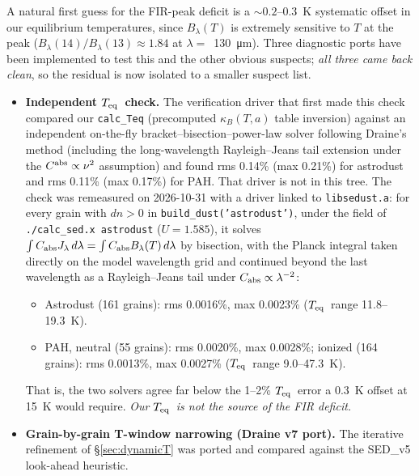 \documentclass{my_memo}
\newcommand{\Teq}{\ensuremath{T_{\rm eq}}}
\begin{document}
A natural first guess for the FIR-peak deficit is a $\sim
0.2$--$0.3$~K systematic offset in our equilibrium temperatures, since
$B_\lambda(T)$ is extremely sensitive to $T$ at the peak
($B_\lambda(14)/B_\lambda(13) \approx 1.84$ at
$\lambda = $~\SI{130}{\micro\meter}). Three diagnostic ports have been
implemented to test this and the other obvious suspects; \emph{all
three came back clean}, so the residual is now isolated to a smaller
suspect list.

\begin{itemize}
  \item \textbf{Independent \Teq\ check.} The verification driver
        that first made this check compared our \texttt{calc\_Teq}
        (precomputed $\kappa_B(T, a)$ table inversion) against an
        independent on-the-fly bracket--bisection--power-law solver
        following Draine's method (including the long-wavelength
        Rayleigh--Jeans tail extension under the $C^{\rm abs} \propto
        \nu^2$ assumption) and found rms 0.14\% (max 0.21\%) for
        astrodust and rms 0.11\% (max 0.17\%) for PAH. That driver is
        not in this tree. The check was remeasured on 2026-10-31 with a
        driver linked to \texttt{libsedust.a}: for every grain with
        $dn > 0$ in \texttt{build\_dust('astrodust')}, under the field
        of \texttt{./calc\_sed.x astrodust} ($U = 1.585$), it solves
        $\int C_{\rm abs} J_\lambda\,d\lambda = \int C_{\rm abs}
        B_\lambda(T)\,d\lambda$ by bisection, with the Planck integral
        taken directly on the model wavelength grid and continued
        beyond the last wavelength as a Rayleigh--Jeans tail under
        $C_{\rm abs} \propto \lambda^{-2}$:
        \begin{itemize}
          \item Astrodust (161 grains): rms 0.0016\%, max 0.0023\%
                (\Teq\ range 11.8--19.3~K).
          \item PAH, neutral (55 grains): rms 0.0020\%, max 0.0028\%;
                ionized (164 grains): rms 0.0013\%, max 0.0027\%
                (\Teq\ range 9.0--47.3~K).
        \end{itemize}
        That is, the two solvers agree far below the 1--2\% \Teq\ error
        a 0.3~K offset at 15~K would require. \emph{Our \Teq\ is not
        the source of the FIR deficit.}
  \item \textbf{Grain-by-grain T-window narrowing (Draine v7 port).} The
        iterative refinement of \S\ref{sec:dynamicT} was ported and
        compared against the SED\_v5 look-ahead heuristic.

\end{itemize}
\end{document}
